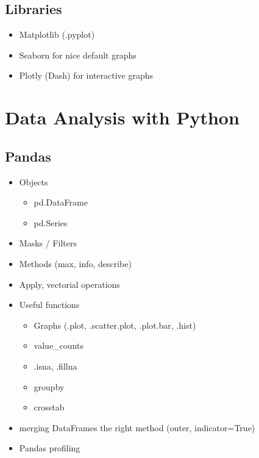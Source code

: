 \subsection{Libraries}
\begin{itemize}
   \item Matplotlib (.pyplot)
   \item Seaborn for nice default graphs
   \item Plotly (Dash) for interactive graphs
\end{itemize}



\section{Data Analysis with Python}


\subsection{Pandas}

\begin{itemize}
   \item Objects
   \begin{itemize}
      \item pd.DataFrame
      \item pd.Series
   \end{itemize}
   \item Masks / Filters
   \item Methods (max, info, describe)
   \item Apply, vectorial operations
   \item Useful functions
   \begin{itemize}
      \item Graphs (.plot, .scatter.plot, .plot.bar, .hist)
      \item value\_counts
      \item .isna, .fillna
      \item groupby
      \item crosstab
   \end{itemize}
   \item merging DataFrames the right method (outer, indicator=True)
   \item Pandas profiling
\end{itemize}



